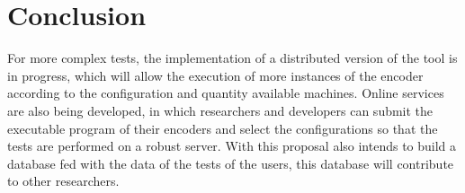 \documentclass[journal]{IEEEtran}
\begin{document}
\section{Conclusion}

For more complex tests, the implementation of a distributed version of the tool is in progress, which will allow the execution of more instances of the encoder according to the configuration and quantity available machines. Online services are also being developed, in which researchers and developers can submit the executable program of their encoders and select the configurations so that the tests are performed on a robust server. With this proposal also intends to build a database fed with the data of the tests of the users, this database will contribute to other researchers.






\end{document}
